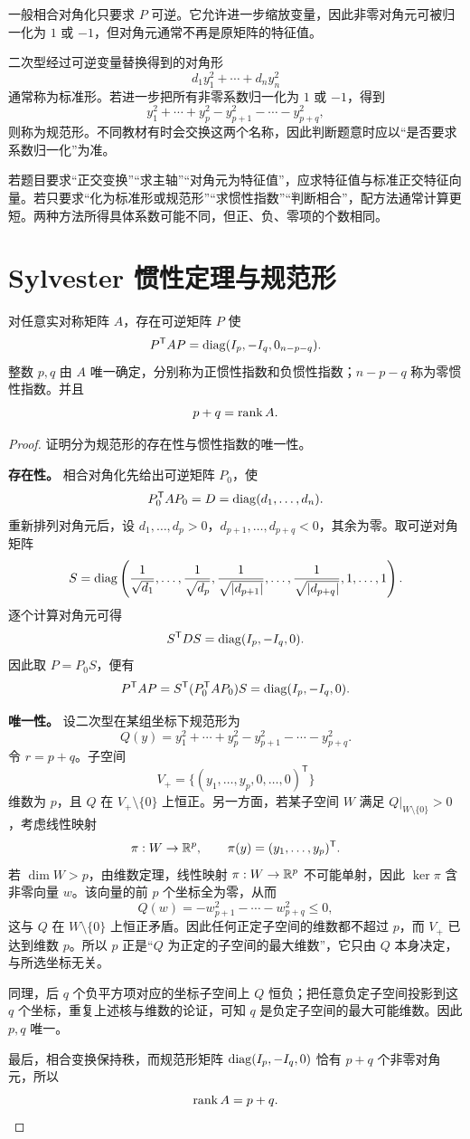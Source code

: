 一般相合对角化只要求 $P$ 可逆。它允许进一步缩放变量，因此非零对角元可被归一化为 $1$ 或 $-1$，但对角元通常不再是原矩阵的特征值。

\begin{definition}[标准形与规范形]
二次型经过可逆变量替换得到的对角形
\[
d_1y_1^2+\cdots+d_ny_n^2
\]
通常称为标准形。若进一步把所有非零系数归一化为 $1$ 或 $-1$，得到
\[
y_1^2+\cdots+y_p^2-y_{p+1}^2-\cdots-y_{p+q}^2,
\]
则称为规范形。不同教材有时会交换这两个名称，因此判断题意时应以“是否要求系数归一化”为准。
\end{definition}

\begin{method}[两种方法的选择]
若题目要求“正交变换”“求主轴”“对角元为特征值”，应求特征值与标准正交特征向量。若只要求“化为标准形或规范形”“求惯性指数”“判断相合”，配方法通常计算更短。两种方法所得具体系数可能不同，但正、负、零项的个数相同。
\end{method}

\section{Sylvester 惯性定理与规范形}

\begin{theorem}
对任意实对称矩阵 $A$，存在可逆矩阵 $P$ 使
\[
P^{\mathsf T}AP=\operatorname{diag}(I_p,-I_q,0_{n-p-q}).
\]
整数 $p,q$ 由 $A$ 唯一确定，分别称为正惯性指数和负惯性指数；$n-p-q$ 称为零惯性指数。并且
\[
p+q=\operatorname{rank} A.
\]
\end{theorem}
\begin{proof}
证明分为规范形的存在性与惯性指数的唯一性。

\textbf{存在性。} 相合对角化先给出可逆矩阵 $P_0$，使
\[
P_0^{\mathsf T}AP_0=D=\operatorname{diag}(d_1,\ldots,d_n).
\]
重新排列对角元后，设 $d_1,\ldots,d_p>0$，$d_{p+1},\ldots,d_{p+q}<0$，其余为零。取可逆对角矩阵
\[
S=\operatorname{diag}\left(\frac1{\sqrt{d_1}},\ldots,
\frac1{\sqrt{d_p}},
\frac1{\sqrt{|d_{p+1}|}},\ldots,
\frac1{\sqrt{|d_{p+q}|}},1,\ldots,1\right).
\]
逐个计算对角元可得
\[
S^{\mathsf T}DS=\operatorname{diag}(I_p,-I_q,0).
\]
因此取 $P=P_0S$，便有
\[
P^{\mathsf T}AP=S^{\mathsf T}(P_0^{\mathsf T}AP_0)S
=\operatorname{diag}(I_p,-I_q,0).
\]

\textbf{唯一性。} 设二次型在某组坐标下规范形为
\[
Q(y)=y_1^2+\cdots+y_p^2-y_{p+1}^2-\cdots-y_{p+q}^2.
\]
令 $r=p+q$。子空间
\[
V_+=\{(y_1,\ldots,y_p,0,\ldots,0)^{\mathsf T}\}
\]
维数为 $p$，且 $Q$ 在 $V_+\setminus\{0\}$ 上恒正。另一方面，若某子空间 $W$ 满足 $Q|_{W\setminus\{0\}}>0$，考虑线性映射
\[
\pi:W\to\mathbb{R}^p,\qquad \pi(y)=(y_1,\ldots,y_p)^{\mathsf T}.
\]
若 $\dim W>p$，由维数定理，线性映射 $\pi:W\to\mathbb{R}^p$ 不可能单射，因此 $\ker\pi$ 含非零向量 $w$。该向量的前 $p$ 个坐标全为零，从而
\[
Q(w)=-w_{p+1}^2-\cdots-w_{p+q}^2\le0,
\]
这与 $Q$ 在 $W\setminus\{0\}$ 上恒正矛盾。因此任何正定子空间的维数都不超过 $p$，而 $V_+$ 已达到维数 $p$。所以 $p$ 正是“$Q$ 为正定的子空间的最大维数”，它只由 $Q$ 本身决定，与所选坐标无关。

同理，后 $q$ 个负平方项对应的坐标子空间上 $Q$ 恒负；把任意负定子空间投影到这 $q$ 个坐标，重复上述核与维数的论证，可知 $q$ 是负定子空间的最大可能维数。因此 $p,q$ 唯一。

最后，相合变换保持秩，而规范形矩阵 $\operatorname{diag}(I_p,-I_q,0)$ 恰有 $p+q$ 个非零对角元，所以
\[
\operatorname{rank} A=p+q.
\]
\end{proof}

